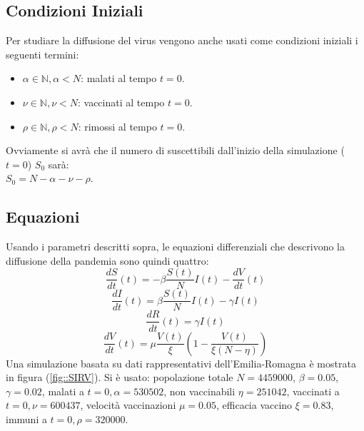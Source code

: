 \documentclass{article}
\begin{document}
\subsection{Condizioni Iniziali}
Per studiare la diffusione del virus vengono anche usati come condizioni iniziali i seguenti termini:
\begin{itemize}
\item $\alpha \in \mathbb{N}, \alpha < N$: malati al tempo $t = 0$.
\item $\nu \in \mathbb{N}, \nu < N $: vaccinati al tempo $t = 0$.
\item $\rho \in \mathbb{N}, \rho < N $: rimossi al tempo $t = 0$.
\end{itemize}
Ovviamente si avrà che il numero di suscettibili dall'inizio della simulazione ($t = 0$) $S_0$ sarà: \\
$S_0 = N - \alpha - \nu - \rho$.\\
\subsection{Equazioni}
Usando i parametri descritti sopra, le equazioni differenziali che descrivono la diffusione della pandemia sono quindi quattro:\\
\begin{equation} \label{eq::S}
\frac{dS}{dt}(t)= -\beta \frac{S(t)}{N}I(t) - \frac{dV}{dt}(t)
\end{equation}
\begin{equation}\label{eq::I}
\frac{dI}{dt}(t)= \beta \frac{S(t)}{N}I(t) - \gamma I(t)
\end{equation}
\begin{equation}\label{eq::R}
\frac{dR}{dt}(t)= \gamma I(t)
\end{equation}
\begin{equation}\label{eq::V}
\frac{dV}{dt}(t)= \mu\frac{V(t)}{\xi}\left( 1-\frac{V(t)}{\xi(N-\eta)}\right)
\end{equation}
Una simulazione basata su dati rappresentativi dell'Emilia-Romagna è mostrata in figura (\ref{fig::SIRV}). Si è usato: popolazione totale $N=4459000$, $\beta=0.05$, $\gamma=0.02$, malati a $t=0, \alpha=530502$, non vaccinabili $\eta = 251042$, vaccinati a $t=0, \nu=600437$, velocità vaccinazioni $\mu = 0.05$, efficacia vaccino $\xi= 0.83$, immuni a $t=0,\rho=320000$.
\end{document}
